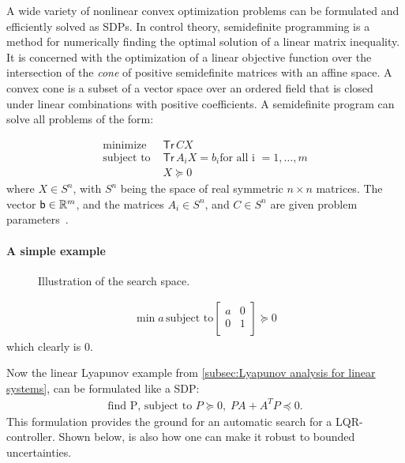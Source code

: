A wide variety of nonlinear convex optimization problems can be formulated and
efficiently solved as \ac{SDP}s. In control theory, semidefinite programming is
a method for numerically finding the optimal solution of a linear matrix
inequality. It is concerned with the optimization of a linear objective function
over the intersection of the \textit{cone} of positive semidefinite matrices
with an affine space. A convex cone is a subset of a vector space over an
ordered field that is closed under linear combinations with positive
coefficients. A semidefinite program can solve all problems of the form:

\begin{align*}
  \text{minimize } &\textsf{Tr}\,CX \\
  \text{subject to } &\textsf{Tr}\,A_{i}X = b_{i} \text{for all i } = 1,\ldots,m\\
                   &X \succeq 0
\end{align*} 
where \(X \in S^n\), with \(S^n\) being the space of real symmetric \(n \times
n\) matrices. The vector \({\mathbf{\mathsf{b}}} \in \mathbb{R}^m\), and the matrices \(A_i \in
S^n\), and \(C \in S^n\) are given problem
parameters~\cite{wolkowiczHandbookSemidefiniteProgramming2000}.

\paragraph{A simple example}
\label{subsec:A simple example}

\begin{figure}
  \centering
  
  \caption[An illustration of the linear search space]{Illustration of the search space.}
\end{figure}

\begin{align*}
  \min{a}\, \text{subject to}
  \begin{bmatrix}
    a & 0 \\
    0 & 1 \\
  \end{bmatrix}
  \succeq 0
\end{align*}
which clearly is \(0\).

Now the linear Lyapunov example from \cref{subsec:Lyapunov analysis for linear
  systems}, can be formulated like a \ac{SDP}:
\begin{align*}
  \text{find P, subject to } P \succeq 0, \; PA + A^{T}P \preceq 0.
\end{align*}
This formulation provides the ground for an automatic search for a
\ac{LQR}-controller. Shown below, is also how one can make it robust to bounded
uncertainties.

